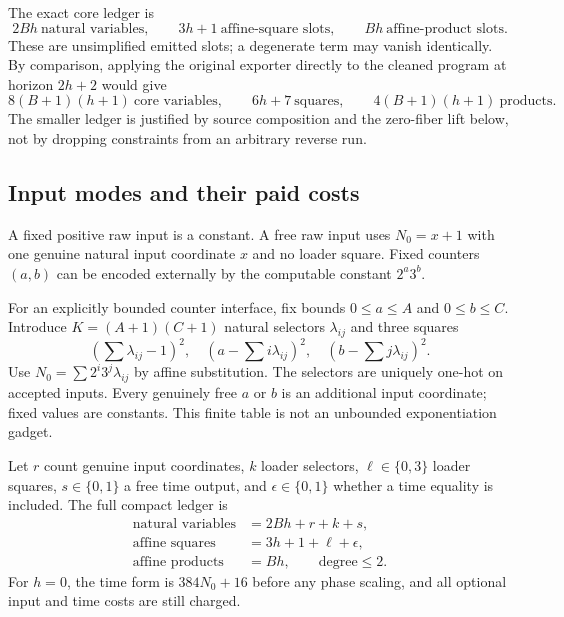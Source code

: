 \documentclass[11pt,letterpaper]{article}
\numberwithin{equation}{section}
\theoremstyle{definition}
\theoremstyle{remark}
\begin{document}
The exact core ledger is
\begin{equation}\label{smc:ct:eq:compactledger}
2Bh\ \text{natural variables},\qquad 3h+1\ \text{affine-square slots},\qquad Bh\ \text{affine-product slots}.
\end{equation}
These are unsimplified emitted slots; a degenerate term may vanish identically. By comparison, applying the original exporter directly to the cleaned program at horizon $2h+2$ would give
\begin{equation}\label{smc:ct:eq:naiveledger}
8(B+1)(h+1)\ \text{core variables},\qquad 6h+7\ \text{squares},\qquad
4(B+1)(h+1)\ \text{products}.
\end{equation}
The smaller ledger is justified by source composition and the zero-fiber lift below, not by dropping constraints from an arbitrary reverse run.

\subsection{Input modes and their paid costs}

A fixed positive raw input is a constant. A free raw input uses $N_0=x+1$ with one genuine natural input coordinate $x$ and no loader square. Fixed counters $(a,b)$ can be encoded externally by the computable constant $2^a3^b$.

For an explicitly bounded counter interface, fix bounds $0\le a\le A$ and $0\le b\le C$. Introduce $K=(A+1)(C+1)$ natural selectors $\lambda_{ij}$ and three squares
\[
\left(\sum\lambda_{ij}-1\right)^2,\quad
\left(a-\sum i\lambda_{ij}\right)^2,\quad
\left(b-\sum j\lambda_{ij}\right)^2.
\]
Use $N_0=\sum 2^i3^j\lambda_{ij}$ by affine substitution. The selectors are uniquely one-hot on accepted inputs. Every genuinely free $a$ or $b$ is an additional input coordinate; fixed values are constants. This finite table is not an unbounded exponentiation gadget.

Let $r$ count genuine input coordinates, $k$ loader selectors, $\ell\in\{0,3\}$ loader squares, $s\in\{0,1\}$ a free time output, and $\epsilon\in\{0,1\}$ whether a time equality is included. The full compact ledger is
\begin{equation}\label{smc:ct:eq:fullledger}
\begin{aligned}
\text{natural variables}&=2Bh+r+k+s,\\
\text{affine squares}&=3h+1+\ell+\epsilon,\\
\text{affine products}&=Bh,\qquad \text{degree}\le2.
\end{aligned}
\end{equation}
For $h=0$, the time form is $384N_0+16$ before any phase scaling, and all optional input and time costs are still charged.
\end{document}
